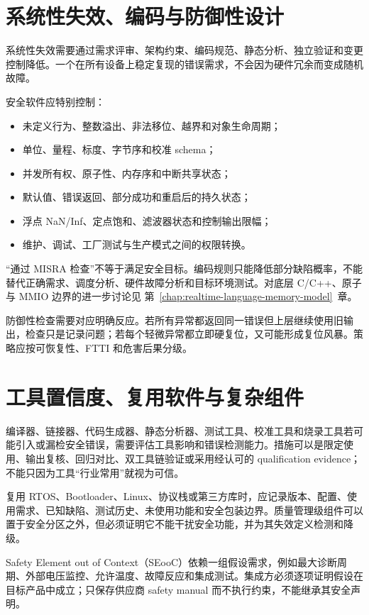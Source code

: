 \section{系统性失效、编码与防御性设计}

系统性失效需要通过需求评审、架构约束、编码规范、静态分析、独立验证和变更控制降低。一个在所有设备上稳定复现的错误需求，不会因为硬件冗余而变成随机故障。

安全软件应特别控制：

\begin{itemize}
  \item 未定义行为、整数溢出、非法移位、越界和对象生命周期；
  \item 单位、量程、标度、字节序和校准 schema；
  \item 并发所有权、原子性、内存序和中断共享状态；
  \item 默认值、错误返回、部分成功和重启后的持久状态；
  \item 浮点 NaN/Inf、定点饱和、滤波器状态和控制输出限幅；
  \item 维护、调试、工厂测试与生产模式之间的权限转换。
\end{itemize}

“通过 MISRA 检查”不等于满足安全目标。编码规则只能降低部分缺陷概率，不能替代正确需求、调度分析、硬件故障分析和目标环境测试。对底层 C/C++、原子与 MMIO 边界的进一步讨论见 \mbox{第~\ref{chap:realtime-language-memory-model}~章}。

防御性检查需要对应明确反应。若所有异常都返回同一错误但上层继续使用旧输出，检查只是记录问题；若每个轻微异常都立即硬复位，又可能形成复位风暴。策略应按可恢复性、FTTI 和危害后果分级。

\section{工具置信度、复用软件与复杂组件}

编译器、链接器、代码生成器、静态分析器、测试工具、校准工具和烧录工具若可能引入或漏检安全错误，需要评估工具影响和错误检测能力。措施可以是限定使用、输出复核、回归对比、双工具链验证或采用经认可的 qualification evidence；不能只因为工具“行业常用”就视为可信。

复用 RTOS、Bootloader、Linux、协议栈或第三方库时，应记录版本、配置、使用需求、已知缺陷、测试历史、未使用功能和安全包装边界。质量管理级组件可以置于安全分区之外，但必须证明它不能干扰安全功能，并为其失效定义检测和降级。

Safety Element out of Context（SEooC）依赖一组假设需求，例如最大诊断周期、外部电压监控、允许温度、故障反应和集成测试。集成方必须逐项证明假设在目标产品中成立；只保存供应商 safety manual 而不执行约束，不能继承其安全声明。

